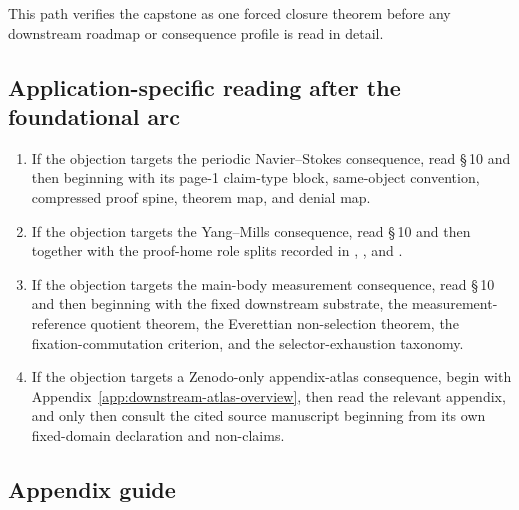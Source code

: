 This path verifies the capstone as one forced closure theorem before any downstream roadmap or consequence profile is read in detail.

\subsection*{Application-specific reading after the foundational arc}

\begin{enumerate}
  \item If the objection targets the periodic Navier--Stokes consequence, read \S\,10 and then \nsdoc{} beginning with its page-1 claim-type block, same-object convention, compressed proof spine, theorem map, and denial map.
  \item If the objection targets the Yang--Mills consequence, read \S\,10 and then \ymmaindoc{} together with the proof-home role splits recorded in \ymcompanionone{}, \ymcompaniontwo{}, and \ymcompanionthree{}.
  \item If the objection targets the main-body measurement consequence, read \S\,10 and then \measurementdoc{} beginning with the fixed downstream substrate, the measurement-reference quotient theorem, the Everettian non-selection theorem, the fixation-commutation criterion, and the selector-exhaustion taxonomy.
  \item If the objection targets a Zenodo-only appendix-atlas consequence, begin with Appendix~\ref{app:downstream-atlas-overview}, then read the relevant appendix, and only then consult the cited source manuscript beginning from its own fixed-domain declaration and non-claims.
\end{enumerate}

\subsection*{Appendix guide}

